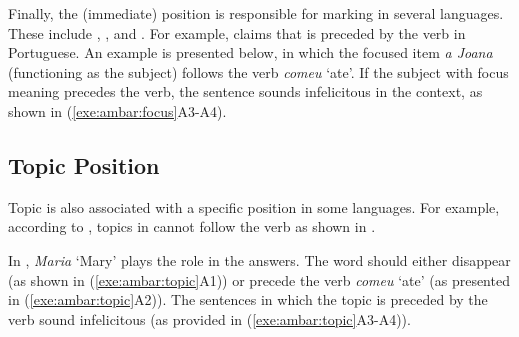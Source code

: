Finally, the (immediate)  position is responsible for
marking  in several languages. These include
 \citep{ambar:99}, , and
 \citep{van:05}.  For example, \citeauthor{ambar:99}
claims that  is preceded by the verb in
Portuguese. An example is presented below, in which the focused item
\textit{a Joana} (functioning as the subject) follows the verb
\textit{comeu} `ate'. If the subject with focus meaning precedes the
verb, the sentence sounds infelicitous in the context, as shown in
(\ref{exe:ambar:focus}A3-A4).






\subsection{Topic Position}
\label{4:ssec:topic-position}

Topic is also associated with a specific position in some languages.
For example, according to \citet{ambar:99}, topics in 
cannot follow the verb as shown in .



\noindent In , \textit{Maria} `Mary' plays the
 role in the answers. The word should either disappear (as shown
in (\ref{exe:ambar:topic}A1)) or precede the verb \textit{comeu} `ate'
(as presented in (\ref{exe:ambar:topic}A2)). The sentences in which
the topic is preceded by the verb sound infelicitous (as provided in
(\ref{exe:ambar:topic}A3-A4)).


